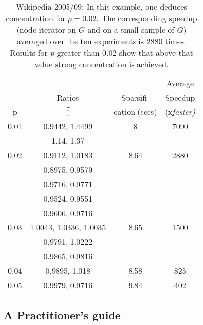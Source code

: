 \documentclass{llncs}
\begin{document}
\begin{table}[ht]
\begin{center}
\begin{tabular}{c|c|c|c}
    &  & & Average   \\ 
     & Ratios & Sparsifi-   & Speedup  \\ 
    p    & \large{$\frac{T}{t}$ }   & cation (secs) & (x\it{faster})  \\ \hline \hline
   
   0.01 & 0.9442,  1.4499    &   8      &     7090               \\
        & 1.14, 1.37         &         &                    \\ \hline
   0.02 & 0.9112, 1.0183 & 8.64  & 2880 \\
        & 0.8975, 0.9579                                          &       & \\
        & 0.9716, 0.9771                                          &       & \\
        & 0.9524, 0.9551                                         &       & \\
        & 0.9606, 0.9716                                        &       & \\ \hline
   0.03 & 1.0043, 1.0336, 1.0035  &  8.65 &1500      \\
        & 0.9791, 1.0222 &    &   \\
        & 0.9865, 0.9816 &    &   \\  \hline
   0.04 & 0.9895, 1.018  &   8.58 &  825   \\ \hline
   0.05 & 0.9979, 0.9716    & 9.84 &  402   \\
   
    
\end{tabular}
\end{center}
\caption{ Wikipedia 2005/09: In this example, one deduces concentration for $p=0.02$. The corresponding speedup 
(node iterator on $G$ and on a small sample of $G$) averaged over the ten experiments is 2880 times. Results for $p$ greater
than 0.02 show that above that value strong concentration is achieved. }
\label{tab:wiki2005}
\end{table}





\subsection{A Practitioner's guide}
\end{document}
